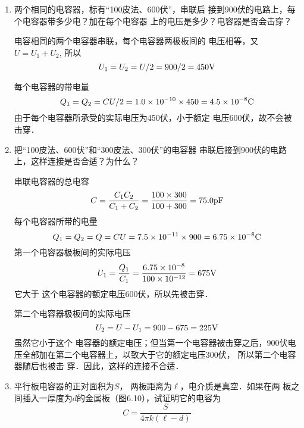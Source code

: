 \begin{enumerate}
\item 两个相同的电容器，标有“100皮法、600伏”，串联后
接到900伏的电路上，每个电容器带多少电？加在每个电容器
上的电压是多少？电容器是否会击穿？

\begin{solution}
    电容相同的两个电容器串联，每个电容器两极板间的
    电压相等，又$U=U_1+U_2$, 所以
   \[ U_1=U_2=U/2=900/2=450{\rm V}\]
 
   每个电容器的带电量
   \[Q_1=Q_2=CU/2=1.0\times10^{-10}\times450=4.5\times10^{-8}{\rm C}\]
    由于每个电容器所承受的实际电压为450伏，小于额定
    电压600伏，故不会被击穿．
\end{solution}

\item 把“100皮法、600伏”和“300皮法、300伏”的电容器
串联后接到900伏的电路上，这样连接是否合适？为什么？

\begin{solution}
    串联电容器的总电容
\[    C=\frac{C_1C_2}{C_1+C_2}=\frac{100\times 300}{100+300}=75.0{\rm pF}\]
    每个电容器所带的电量
\[    Q_1=Q_2=Q=CU=7.5\times10^{-11}\times900=6.75\times10^{-8}{\rm C}\]
    第一个电容器极板间的实际电压
    \[U_1=\frac{Q_1}{C_1}=\frac{6.75\times10^{-8}}{100\times10^{-12}}=675{\rm V}\]
它大于
这个电容器的额定电压600伏，所以先被击穿．

第二个电容器极板间的实际电压
\[U_2=U-U_1=900-675=225{\rm V}\]
虽然它小于这个
电容器的额定电压；但当第一个电容器被击穿之后，900伏电
压全部加在第二个电容器上，以致大于它的额定电压300伏，
所以第二个电容器随后也被击
穿．因此，这样的连接不合适．
\end{solution}

\item 平行板电容器的正对面积为$S$，
两板距离为$\ell$，电介质是真空．如果在两
板之间插入一厚度为$d$的金属板（图6.10），试证明它的电容为
\[C=\frac{S}{4\pi k(\ell-d)}\]
\begin{figure}[htp]\centering


\end{figure}
\end{enumerate}
